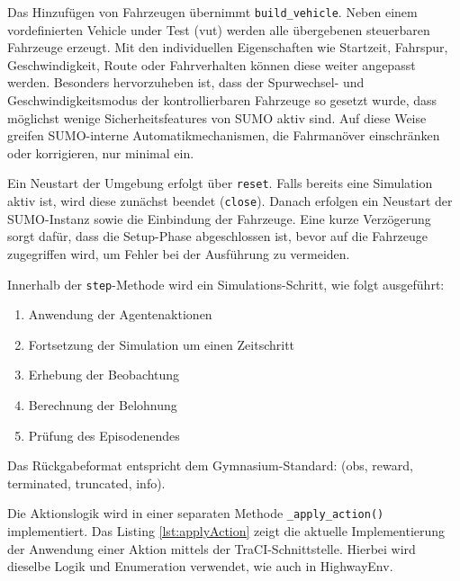 Das Hinzufügen von Fahrzeugen übernimmt \texttt{build\_vehicle}. Neben einem vordefinierten Vehicle under Test (vut)
werden alle übergebenen steuerbaren Fahrzeuge erzeugt. Mit den individuellen Eigenschaften wie Startzeit, Fahrspur, Geschwindigkeit, Route oder Fahrverhalten können diese weiter angepasst werden. Besonders hervorzuheben ist, dass der Spurwechsel- und Geschwindigkeitsmodus der kontrollierbaren Fahrzeuge so gesetzt wurde, dass möglichst wenige Sicherheitsfeatures von SUMO aktiv sind. Auf diese Weise greifen SUMO-interne Automatikmechanismen, die Fahrmanöver einschränken oder korrigieren, nur minimal ein. 

Ein Neustart der Umgebung erfolgt über \texttt{reset}. Falls bereits eine Simulation aktiv ist, wird diese zunächst beendet (\texttt{close}). Danach erfolgen ein Neustart der SUMO-Instanz sowie die Einbindung der Fahrzeuge. Eine kurze Verzögerung sorgt dafür, dass die Setup-Phase abgeschlossen ist, bevor auf die Fahrzeuge zugegriffen wird, um Fehler bei der Ausführung zu vermeiden.

Innerhalb der \texttt{step}-Methode wird ein Simulations-Schritt, wie folgt ausgeführt:
\begin{enumerate}
    \item Anwendung der Agentenaktionen
    \item Fortsetzung der Simulation um einen Zeitschritt
    \item Erhebung der Beobachtung
    \item Berechnung der Belohnung
    \item Prüfung des Episodenendes
\end{enumerate}
Das Rückgabeformat entspricht dem Gymnasium-Standard: (obs, reward, terminated, truncated, info).

Die Aktionslogik wird in einer separaten Methode \texttt{\_apply\_action()} implementiert. Das Listing \ref{lst:applyAction} zeigt die aktuelle Implementierung der Anwendung einer Aktion mittels der TraCI-Schnittstelle. Hierbei wird dieselbe Logik und Enumeration verwendet, wie auch in HighwayEnv.

